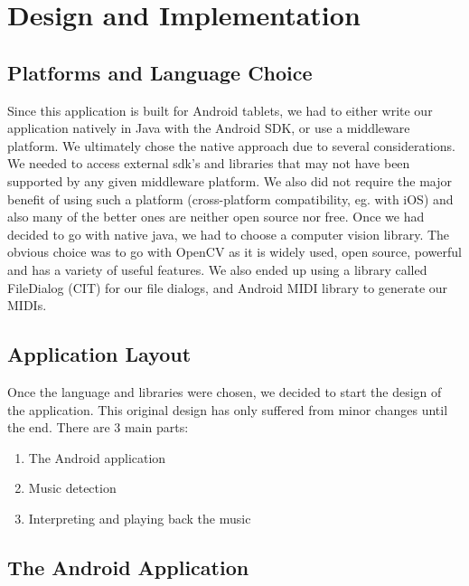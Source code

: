 \section{Design and Implementation}

\subsection{Platforms and Language Choice}

Since this application is built for Android tablets, we had to either write our application natively in Java with the Android SDK, or use a middleware platform. We ultimately chose the native approach due to several considerations. We needed to access external sdk’s and libraries that may not have been supported by any given middleware platform. We also did not require the major benefit of using such a platform (cross-platform compatibility, eg. with iOS) and also many of the better ones are neither open source nor free. 
Once we had decided to go with native java, we had to choose a computer vision library. The obvious choice was to go with OpenCV as it is widely used, open source, powerful and has a variety of useful features. We also ended up using a library called FileDialog (CIT) for our file dialogs, and Android MIDI library to generate our MIDIs.

\subsection{Application Layout}

Once the language and libraries were chosen, we decided to start the design of the application. This original design has only suffered from minor changes until the end. There are 3 main parts: 
\begin{enumerate}
\item{The Android application}
\item{Music detection}
\item{Interpreting and playing back the music}
\end{enumerate}

\subsection{The Android Application}

